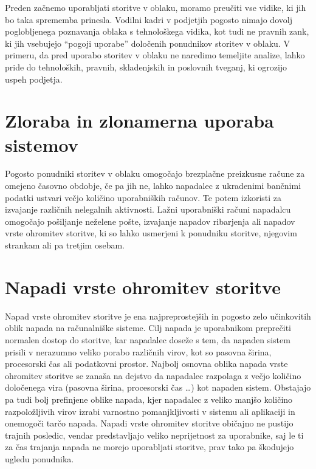 \documentclass[12pt,a4paper,openany,tikz]{book}
\theoremstyle{plain}
\theoremstyle{definition}
\begin{document}
Preden začnemo uporabljati storitve v oblaku, moramo preučiti vse vidike, ki jih bo taka sprememba prinesla. Vodilni kadri v podjetjih pogosto nimajo dovolj poglobljenega poznavanja oblaka s tehnološkega vidika, kot tudi ne pravnih zank, ki jih vsebujejo ``pogoji uporabe'' določenih ponudnikov storitev v oblaku. V primeru, da pred uporabo storitev v oblaku ne naredimo temeljite analize, lahko pride do tehnoloških, pravnih, skladenjskih in poslovnih tveganj, ki ogrozijo uspeh podjetja.

\section{Zloraba in zlonamerna uporaba sistemov}
\label{sub:Zloraba in zlonamerna uporaba sistemov}

Pogosto ponudniki storitev v oblaku omogočajo brezplačne preizkusne račune za omejeno časovno obdobje, če pa jih ne, lahko napadalec z ukradenimi bančnimi podatki ustvari večjo količino uporabniških računov. Te potem izkoristi za izvajanje različnih nelegalnih aktivnosti. Lažni uporabniški računi napadalcu omogočajo pošiljanje neželene pošte, izvajanje napadov ribarjenja ali napadov vrste ohromitev storitve, ki so lahko usmerjeni k ponudniku storitve, njegovim strankam ali pa tretjim osebam.

\section{Napadi vrste ohromitev storitve}
\label{subs:Napadi vrste ohromitev storitve}

Napad vrste ohromitev storitve je ena najpreprostejših in pogosto zelo učinkovitih oblik napada na računalniške sisteme. Cilj napada je uporabnikom preprečiti normalen dostop do storitve, kar napadalec doseže s tem, da napaden sistem prisili v nerazumno veliko porabo različnih virov, kot so pasovna širina, procesorski čas ali podatkovni prostor. Najbolj osnovna oblika napada vrste ohromitev storitve se zanaša na dejstvo da napadalec razpolaga z večjo količino določenega vira (pasovna širina, procesorski čas …) kot napaden sistem. Obstajajo pa tudi bolj prefinjene oblike napada, kjer napadalec z veliko manjšo količino razpoložljivih virov izrabi varnostno pomanjkljivosti v sistemu ali aplikaciji in onemogoči tarčo napada. Napadi vrste ohromitev storitve običajno ne pustijo trajnih posledic, vendar predstavljajo veliko neprijetnost za uporabnike, saj le ti za čas trajanja napada ne morejo uporabljati storitve, prav tako pa škodujejo ugledu ponudnika.
\end{document}
